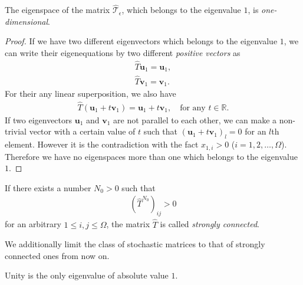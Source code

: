 \begin{lemma}
	The eigenspace of the matrix $\hat{\mathcal{T}}_{\epsilon}$, which belongs to the eigenvalue $1$, is \textit{one-dimensional}. 
\end{lemma}

\begin{proof}
	If we have two different eigenvectors which belongs to the eigenvalue $1$, we can write their eigenequations by two different \textit{positive vectors} as
	\begin{align}
	\hat{T}\bm{u}_{1} = \bm{u}_{1},\\
	\hat{T}\bm{v}_{1} = \bm{v}_{1}.
	\end{align}
	For their any linear superposition, we also have
	\begin{align}
	\hat{T}(\bm{u}_{1} + t\bm{v}_{1}) = \bm{u}_{1} + t\bm{v}_{1},\quad\text{for any $t\in\mathbb{R}$}.
	\end{align}
	If two eigenvectors $\bm{u}_{1}$ and $\bm{v}_{1}$ are not parallel to each other, we can make a non-trivial vector with a certain value of $t$ such that $\left(\bm{u}_{1} + t\bm{v}_{1}\right)_{l} = 0$ for an $l$th element. However it is the contradiction with the fact $x_{1,i}>0$ ($i=1,2,\dots,\Omega$). Therefore we have no eigenspaces more than one which belongs to the eigenvalue $1$.
\end{proof}

\begin{definition}
	If there exists a number $N_{0}>0$ such that
	\begin{align}
	\left(\hat{T}^{N_{0}}\right)_{ij}>0
	\end{align}
	for an arbitrary $1\leq i,j\leq \Omega$, the matrix $\hat{T}$ is called \textit{strongly connected}.
\end{definition}

We additionally limit the class of stochastic matrices to that of strongly connected ones from now on.

\begin{theorem}
	Unity is the only eigenvalue of absolute value $1$.
\end{theorem}


